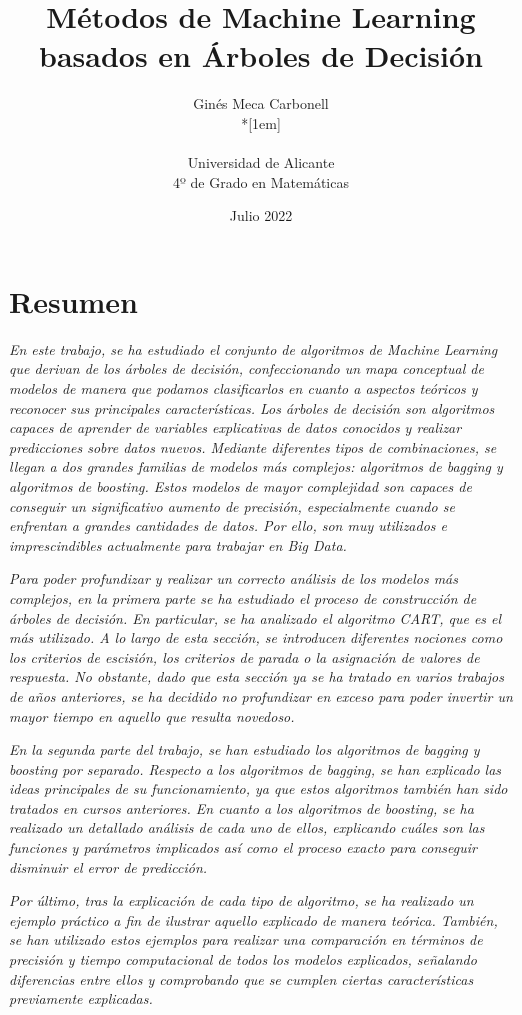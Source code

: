 \documentclass[12pt,twoside]{article}
\title{Métodos de Machine Learning basados en Árboles de Decisión}
\author{Ginés Meca Carbonell\\*[1em]
\begin{minipage}{0.75\textwidth}
\footnotesize \itshape
\begin{center}
Universidad de Alicante \\
4º de Grado en Matemáticas
\end{center}
\end{minipage}
}
\date{Julio 2022}
\begin{document}




\section*{Resumen}

\emph{En este trabajo, se ha estudiado el conjunto de algoritmos de Machine Learning que derivan de los árboles de decisión, confeccionando un mapa conceptual de modelos de manera que podamos clasificarlos en cuanto a aspectos teóricos y reconocer sus principales características. Los árboles de decisión son algoritmos capaces de aprender de variables explicativas de datos conocidos y realizar predicciones sobre datos nuevos. Mediante diferentes tipos de combinaciones, se llegan a dos grandes familias de modelos más complejos: algoritmos de bagging y algoritmos de boosting. Estos modelos de mayor complejidad son capaces de conseguir un significativo aumento de precisión, especialmente cuando se enfrentan a grandes cantidades de datos. Por ello, son muy utilizados e imprescindibles actualmente para trabajar en Big Data.}

\emph{Para poder profundizar y realizar un correcto análisis de los modelos más complejos, en la primera parte se ha estudiado el proceso de construcción de árboles de decisión. En particular, se ha analizado el algoritmo CART, que es el más utilizado. A lo largo de esta sección, se introducen diferentes nociones como los criterios de escisión, los criterios de parada o la asignación de valores de respuesta. No obstante, dado que esta sección ya se ha tratado en varios trabajos de años anteriores, se ha decidido no profundizar en exceso para poder invertir un mayor tiempo en aquello que resulta novedoso.}

\emph{En la segunda parte del trabajo, se han estudiado los algoritmos de bagging y boosting por separado. Respecto a los algoritmos de bagging, se han explicado las ideas principales de su funcionamiento, ya que estos algoritmos también han sido tratados en cursos anteriores. En cuanto a los algoritmos de boosting, se ha realizado un detallado análisis de cada uno de ellos, explicando cuáles son las funciones y parámetros implicados así como el proceso exacto para conseguir disminuir el 
error de predicción.}

\emph{Por último, tras la explicación de cada tipo de algoritmo, se ha realizado un ejemplo práctico a fin de ilustrar aquello explicado de manera teórica. También, se han utilizado estos ejemplos para realizar una comparación en términos de precisión y tiempo computacional de todos los modelos explicados, señalando diferencias entre ellos y comprobando que se cumplen ciertas características previamente explicadas.}
\end{document}
